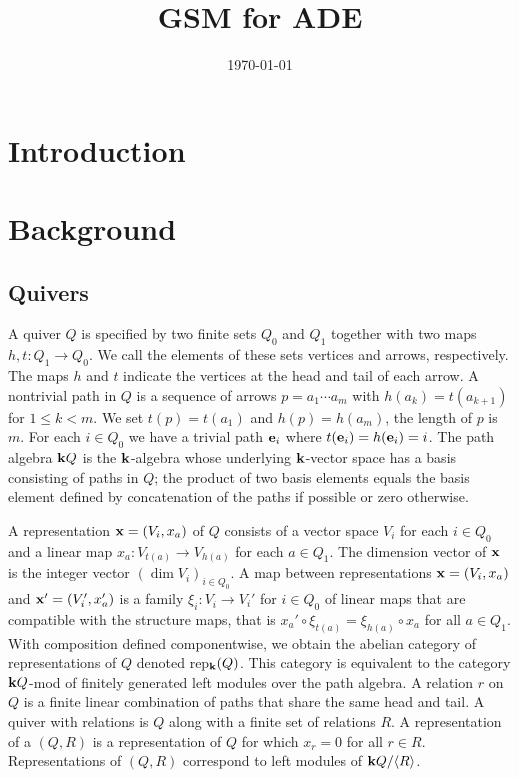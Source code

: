 \documentclass{amsart}
\title{GSM for ADE}
\date{\today}
\theoremstyle{definition}
\begin{document}
\maketitle

\section{Introduction}

\section{Background}

\subsection{Quivers}
A quiver $Q$ is specified by two finite sets $Q_0$ and $Q_1$ together with two maps $h, t \colon Q_1 \rightarrow Q_0$. We call the elements of these sets vertices and arrows, respectively.  The maps $h$ and $t$ indicate the vertices at the head and tail of each arrow.
A nontrivial path in $Q$ is a sequence of arrows $p = a_1 \dotsb a_m$ with $h(a_{k}) = t(a_{k+1})$ for $1 \leq k < m$.  We set $t(p) = t(a_{1})$ and $h(p)= h(a_m)$, the length of $p$ is $m$.  
For each $i \in Q_0$ we have a trivial path $\mathbf{e}_i$ where $t(\mathbf{e}_i) = h(\mathbf{e}_i) = i$.  
The path algebra $\mathbf{k} Q$ is the $\mathbf{k}$-algebra whose underlying $\mathbf{k}$-vector space has a basis consisting of paths in $Q$; the product of two basis elements equals the basis element defined by concatenation of the paths if possible or zero otherwise.

A representation $\mathbf{x} = (V_i, x_a)$ of $Q$ consists of a vector space $V_i$ for each $i \in Q_0$ and a linear map $x_a \colon V_{t(a)} \rightarrow V_{h(a)}$ for each $a \in Q_1$. 
The dimension vector of $\mathbf{x}$ is the integer vector $(\dim V_{i})_{i\in Q_0}$.  
A map between representations $\mathbf{x} = (V_i, x_a)$ and $\mathbf{x}' = (V_i', x_a')$ is a family $\xi_{i} \colon V_i^{\,} \rightarrow V_i'$ for $i \in Q_0$ of linear maps that are compatible with the structure maps, that is $x_a' \circ\xi_{t(a)} = \xi_{h(a)} \circ x_a$ for all $a \in Q_1$.  
With composition defined componentwise, we obtain the abelian category of representations of $Q$ denoted rep$_{\mathbf{k}}(Q)$. 
This category is equivalent to the category $\mathbf{k} Q$-mod of finitely generated left modules over the path algebra.
A relation $r$ on $Q$ is a finite linear combination of paths that share the same head and tail.
A quiver with relations is $Q$ along with a finite set of relations $R$.
A representation of a $(Q,R)$ is a representation of $Q$ for which $x_r=0$ for all $r\in R$.
Representations of $(Q,R)$ correspond to left modules of $\mathbf{k} Q/ \langle R \rangle$.
\end{document}

